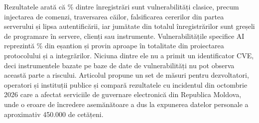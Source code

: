 \par Rezultatele arată că \pClassicComma\% dintre înregistrări sunt vulnerabilități clasice, precum injectarea de comenzi, traversarea căilor, falsificarea cererilor din partea serverului și lipsa autentificării, iar jumătate din totalul înregistrărilor sunt greșeli de programare în servere, clienți sau instrumente. Vulnerabilitățile specifice AI reprezintă \pNativeComma\% din eșantion și provin aproape în totalitate din proiectarea protocolului și a integrărilor. Niciuna dintre ele nu a primit un identificator CVE, deci instrumentele bazate pe baze de date de vulnerabilități nu pot observa această parte a riscului. Articolul propune un set de măsuri pentru dezvoltatori, operatori și instituții publice și compară rezultatele cu incidentul din octombrie 2026 care a afectat serviciile de guvernare electronică din Republica Moldova, unde o eroare de încredere asemănătoare a dus la expunerea datelor personale a aproximativ 450.000 de cetățeni.
